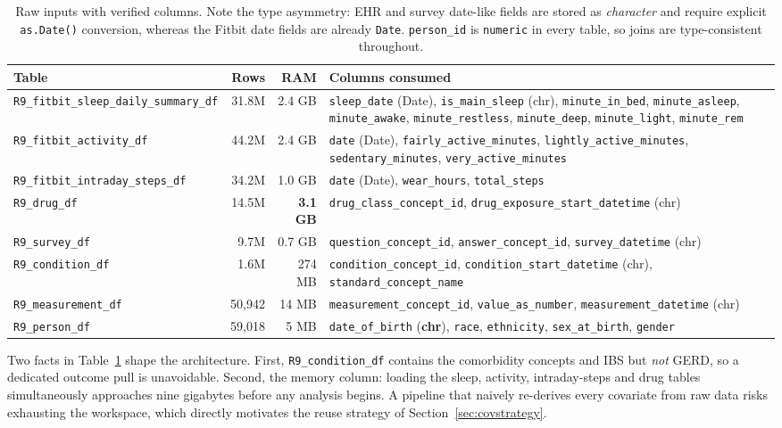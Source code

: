\documentclass[11pt]{article}
\newcommand{\code}[1]{\texttt{\small #1}}
\begin{document}
\begin{table}[h]\centering\footnotesize
\begin{tabular}{@{}p{4.9cm} r r p{5.3cm}@{}}
\toprule
\textbf{Table} & \textbf{Rows} & \textbf{RAM} & \textbf{Columns consumed} \\
\midrule
\code{R9_fitbit_sleep_daily_summary_df} & 31.8M & 2.4 GB & \code{sleep_date} (Date),
\code{is_main_sleep} (chr), \code{minute_in_bed}, \code{minute_asleep}, \code{minute_awake},
\code{minute_restless}, \code{minute_deep}, \code{minute_light}, \code{minute_rem} \\
\addlinespace
\code{R9_fitbit_activity_df} & 44.2M & 2.4 GB & \code{date} (Date),
\code{fairly_active_minutes}, \code{lightly_active_minutes}, \code{sedentary_minutes},
\code{very_active_minutes} \\
\addlinespace
\code{R9_fitbit_intraday_steps_df} & 34.2M & 1.0 GB & \code{date} (Date), \code{wear_hours},
\code{total_steps} \\
\addlinespace
\code{R9_drug_df} & 14.5M & \textbf{3.1 GB} & \code{drug_class_concept_id},
\code{drug_exposure_start_datetime} (chr) \\
\addlinespace
\code{R9_survey_df} & 9.7M & 0.7 GB & \code{question_concept_id}, \code{answer_concept_id},
\code{survey_datetime} (chr) \\
\addlinespace
\code{R9_condition_df} & 1.6M & 274 MB & \code{condition_concept_id},
\code{condition_start_datetime} (chr), \code{standard_concept_name} \\
\addlinespace
\code{R9_measurement_df} & 50,942 & 14 MB & \code{measurement_concept_id}, \code{value_as_number},
\code{measurement_datetime} (chr) \\
\addlinespace
\code{R9_person_df} & 59,018 & 5 MB & \code{date_of_birth} (\textbf{chr}), \code{race},
\code{ethnicity}, \code{sex_at_birth}, \code{gender} \\
\bottomrule
\end{tabular}
\caption{Raw inputs with verified columns. Note the type asymmetry: EHR and survey date-like fields
are stored as \emph{character} and require explicit \code{as.Date()} conversion, whereas the Fitbit
date fields are already \code{Date}. \code{person_id} is \code{numeric} in every table, so joins are
type-consistent throughout.}
\label{tab:rawschema}
\end{table}

Two facts in Table~\ref{tab:rawschema} shape the architecture. First, \code{R9_condition_df} contains
the comorbidity concepts and IBS but \emph{not} GERD, so a dedicated outcome pull is unavoidable.
Second, the memory column: loading the sleep, activity, intraday-steps and drug tables simultaneously
approaches nine gigabytes before any analysis begins. A pipeline that naively re-derives every
covariate from raw data risks exhausting the workspace, which directly motivates the reuse strategy of
Section~\ref{sec:covstrategy}.
\end{document}
